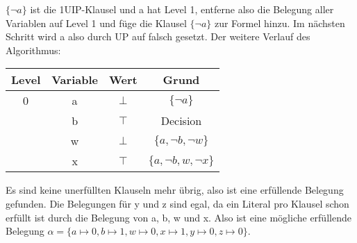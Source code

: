 \documentclass[a4paper,10pt]{article}
\begin{document}
$\{\neg a\}$ ist die 1UIP-Klausel und a hat Level 1, entferne also die Belegung aller Variablen auf Level 1 und füge die Klausel $\{\neg a\}$ zur Formel hinzu. Im nächsten Schritt wird a also durch UP auf falsch gesetzt. Der weitere Verlauf des Algorithmus:
\begin{center}
\begin{tabular}{|c|c|c|c|}
\hline 
\rule[-1ex]{0pt}{2.5ex} Level & Variable & Wert & Grund \\ 
\hline 
\rule[-1ex]{0pt}{2.5ex} 0 & a & $\bot$ & $\{\neg a\}$ \\ 
\hline 
\rule[-1ex]{0pt}{2.5ex}  & b & $\top$ & Decision \\ 
\hline 
\rule[-1ex]{0pt}{2.5ex}  & w & $\bot$ & $\{a, \neg b, \neg w\}$ \\ 
\hline 
\rule[-1ex]{0pt}{2.5ex}  & x & $\top$ & $\{a, \neg b, w, \neg x\}$ \\ 
\hline 
\end{tabular} 
\end{center}
Es sind keine unerfüllten Klauseln mehr übrig, also ist eine erfüllende Belegung gefunden. Die Belegungen für y und z sind egal, da ein Literal pro Klausel schon erfüllt ist durch die Belegung von a, b, w und x. Also ist eine mögliche erfüllende Belegung $\alpha = \{a \mapsto 0, b \mapsto 1, w \mapsto 0, x \mapsto 1, y \mapsto 0, z \mapsto 0\}$.
\end{document}
